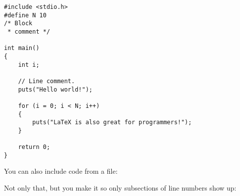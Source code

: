 
\begin{lstlisting}[style=s-C++, caption=C++ Example]
#include <stdio.h>
#define N 10
/* Block
 * comment */
 
int main()
{
    int i;
 
    // Line comment.
    puts("Hello world!");
 
    for (i = 0; i < N; i++)
    {
        puts("LaTeX is also great for programmers!");
    }
 
    return 0;
}
\end{lstlisting}

You can also include code from a file:


Not only that, but you make it so only subsections of line numbers show up:


\begin{lstlisting}[style=s-tex, caption=Source: Lines 6-11]

\end{lstlisting}
